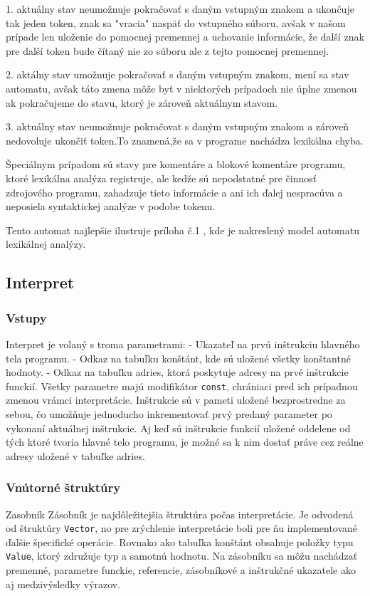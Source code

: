 \documentclass[12pt,a4paper,titlepage,final]{article}
\begin{document}
1. aktuálny stav neumožnuje pokračovať s daným vstupným znakom a ukončuje tak
jeden token, znak sa "vracia" naspäť do vstupného súboru, avšak v našom prípade
len uloženie do pomocnej premennej a uchovanie informácie, že další znak pre
další token bude čítaný nie zo súboru ale z tejto pomocnej premennej.

2. aktálny stav umožnuje pokračovať s daným vstupným znakom, mení sa stav automatu,
avšak táto zmena môže byť v niektorých prípadoch nie úplne zmenou ak pokračujeme
do stavu, ktorý je zároveň aktuálnym stavom.

3. aktuálny stav neumožnuje pokračovat s daným vstupným znakom a zároveň
nedovoluje ukončiť token.To znamená,že sa v programe nachádza lexikálna chyba.

Špeciálnym prípadom sú stavy pre komentáre a blokové komentáre programu, ktoré
lexikálna analýza registruje, ale kedže sú nepodstatné pre činnosť zdrojového
programu, zahadzuje tieto informácie a ani ich ďalej nespracúva a neposiela
syntaktickej analýze v podobe tokenu.

Tento automat najlepšie ilustruje príloha č.1 , kde je nakreslený model
automatu lexikálnej analýzy.

\subsection{Interpret}

\subsubsection{Vstupy}
Interpret je volaný s troma parametrami:
- Ukazateľ na prvú inštrukciu hlavného tela programu.
- Odkaz na tabuľku konštánt, kde sú uložené všetky konštantné hodnoty.
- Odkaz na tabuľku adries, ktorá poskytuje adresy na prvé inštrukcie funckií.
Všetky parametre majú modifikátor \texttt{const}, chrániaci pred ich prípadnou zmenou
vrámci interpretácie. Inštrukcie sú v pameti uložené bezprostredne za sebou, čo
umožňuje jednoducho inkrementovať prvý predaný parameter po vykonaní aktuálnej
inštrukcie. Aj keď sú inštrukcie funkcií uložené oddelene od tých ktoré tvoria hlavné
telo programu, je možné sa k nim dostať práve cez reálne adresy uložené v tabuľke adries.

\subsubsection{Vnútorné štruktúry}
Zasobník
Zásobník je najdôležitejšia štruktúra počas interpretácie. Je odvodená od štruktúry
\texttt{Vector}, no pre zrýchlenie interpretácie boli pre ňu implementované ďalšie
špecifické operácie. Rovnako ako tabuľka konštánt obsahuje položky typu \texttt{Value}, 
ktorý združuje typ a samotnú hodnotu. Na zásobníku sa môžu nachádzať premenné, parametre
funckie, referencie, zásobníkové a inštrukčné ukazatele ako aj medzivýsledky výrazov.
\end{document}
